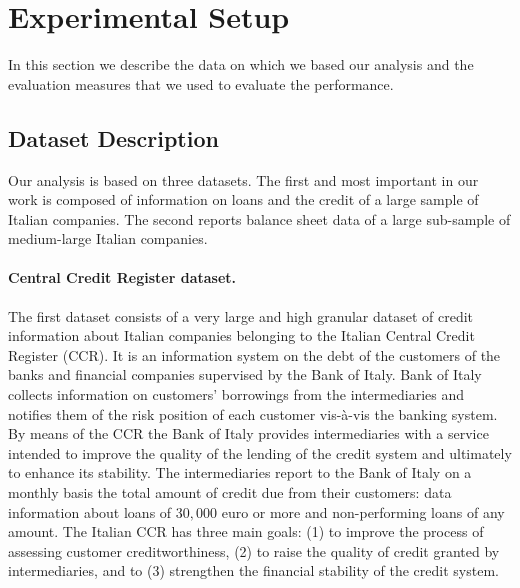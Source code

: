 \section{Experimental Setup }
\label{sec:approach}

In this section we describe the data on which we based our analysis and
the evaluation measures that we used to evaluate the performance.
\subsection{Dataset Description}
\label{subsec:dataset-description}

Our analysis is based on three datasets. The first and most important in
our work is composed of information on loans and the credit of a large
sample of Italian companies. The second reports balance sheet data of a
large sub-sample of medium-large Italian companies.


\paragraph{Central Credit Register dataset.} 

The first dataset consists of a very large and high granular dataset of credit
information about Italian companies belonging to the Italian Central Credit Register (CCR).  It is an information system on the debt
of the customers of the banks and financial companies supervised by the Bank of Italy. Bank of Italy collects information on customers'
borrowings from the intermediaries and notifies them of the risk position of each customer vis-à-vis the banking system.
By means of the CCR the Bank of Italy provides
intermediaries with a service intended to improve the quality of the lending of the credit system and ultimately to enhance its stability.
The intermediaries report to the Bank of Italy on a monthly basis the total amount of credit due from their customers: data information about
loans of $30,000$ euro or more and non-performing loans of any amount.
The Italian CCR has three main goals: (1)
to improve the process of assessing customer creditworthiness, (2) to raise the quality of credit granted by intermediaries, and to (3) strengthen
the financial stability of the credit system. 


